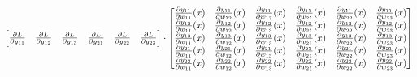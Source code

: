 \documentclass{article}
\begin{document}
\begin{align*}
        \begin{bmatrix}
            \frac{\partial L}{\partial y_{11}} & \frac{\partial L}{\partial y_{12}} & 
            \frac{\partial L}{\partial y_{13}} & \frac{\partial L}{\partial y_{21}} & 
            \frac{\partial L}{\partial y_{22}} & \frac{\partial L}{\partial y_{23}}
        \end{bmatrix} \cdot
        \renewcommand{\arraystretch}{0.7}
        \begin{bmatrix}
            \frac{\partial y_{11}}{\partial w_{11}}(x) & \frac{\partial y_{11}}{\partial w_{12}}(x) &
            \frac{\partial y_{11}}{\partial w_{13}}(x) & \frac{\partial y_{11}}{\partial w_{21}}(x) &
            \frac{\partial y_{11}}{\partial w_{22}}(x) & \frac{\partial y_{11}}{\partial w_{23}}(x) \\
            \frac{\partial y_{12}}{\partial w_{11}}(x) & \frac{\partial y_{12}}{\partial w_{12}}(x) &
            \frac{\partial y_{12}}{\partial w_{13}}(x) & \frac{\partial y_{12}}{\partial w_{21}}(x) &
            \frac{\partial y_{12}}{\partial w_{22}}(x) & \frac{\partial y_{12}}{\partial w_{23}}(x) \\
            \frac{\partial y_{13}}{\partial w_{11}}(x) & \frac{\partial y_{13}}{\partial w_{12}}(x) &
            \frac{\partial y_{13}}{\partial w_{13}}(x) & \frac{\partial y_{13}}{\partial w_{21}}(x) &
            \frac{\partial y_{13}}{\partial w_{22}}(x) & \frac{\partial y_{13}}{\partial w_{23}}(x) \\
            \frac{\partial y_{21}}{\partial w_{11}}(x) & \frac{\partial y_{21}}{\partial w_{12}}(x) &
            \frac{\partial y_{21}}{\partial w_{13}}(x) & \frac{\partial y_{21}}{\partial w_{21}}(x) &
            \frac{\partial y_{21}}{\partial w_{22}}(x) & \frac{\partial y_{21}}{\partial w_{23}}(x) \\
            \frac{\partial y_{22}}{\partial w_{11}}(x) & \frac{\partial y_{22}}{\partial w_{12}}(x) &
            \frac{\partial y_{22}}{\partial w_{13}}(x) & \frac{\partial y_{22}}{\partial w_{21}}(x) &
            \frac{\partial y_{22}}{\partial w_{22}}(x) & \frac{\partial y_{22}}{\partial w_{23}}(x) \\

\end{bmatrix}
\end{align*}
\end{document}

